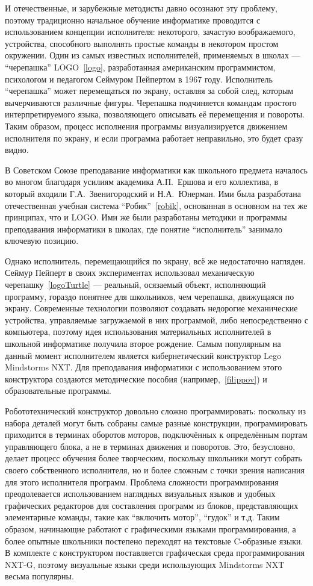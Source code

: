 \documentclass[a4paper]{article}
\begin{document}
И отечественные, и зарубежные методисты давно осознают эту проблему, поэтому традиционно начальное обучение информатике проводится с использованием концепции исполнителя: некоторого, зачастую воображаемого, устройства, способного выполнять простые команды в некотором простом окружении. Один из самых известных исполнителей, применяемых в школах --- ``черепашка'' LOGO~\ref{logo}, разработанная американским программистом, психологом и педагогом Сеймуром Пейпертом в 1967 году. Исполнитель ``черепашка'' может перемещаться по экрану, оставляя за собой след, которым вычерчиваются различные фигуры. Черепашка подчиняется командам простого интерпретируемого языка, позволяющего описывать её перемещения и повороты. Таким образом, процесс исполнения программы визуализируется движением исполнителя по экрану, и если программа работает неправильно, это будет сразу видно. 

В Советском Союзе преподавание информатики как школьного предмета началось во многом благодаря усилиям академика А.П.~Ершова и его коллектива, в который входили Г.А.~Звенигородский и Н.А.~Юнерман. Ими была разработана отечественная учебная система ``Робик''~\ref{robik}, основанная в основном на тех же принципах, что и LOGO. Ими же были разработаны методики и программы преподавания информатики в школах, где понятие ``исполнитель'' занимало ключевую позицию.

Однако исполнитель, перемещающийся по экрану, всё же недостаточно нагляден. Сеймур Пейперт в своих экспериментах использовал механическую черепашку~\ref{logoTurtle} --- реальный, осязаемый объект, исполняющий программу, гораздо понятнее для школьников, чем черепашка, движущаяся по экрану. Современные технологии позволяют создавать недорогие механические устройства, управляемые загружаемой в них программой, либо непосредственно с компьютера, поэтому идея использования материальных исполнителей в школьной информатике получила второе рождение. Самым популярным на данный момент исполнителем является кибернетический конструктор Lego Mindstorms NXT. Для преподавания информатики с использованием этого конструктора создаются методические пособия (например,~\ref{filippov}) и образовательные программы. 

Робототехнический конструктор довольно сложно программировать: поскольку из набора деталей могут быть собраны самые разные конструкции, программировать приходится в терминах оборотов моторов, подключённых к определённым портам управляющего блока, а не в терминах движения и поворотов. Это, безусловно, делает процесс обучения более творческим, поскольку школьники могут собрать своего собственного исполнителя, но и более сложным с точки зрения написания для этого исполнителя программ. Проблема сложности программирования преодолевается использованием наглядных визуальных языков и удобных графических редакторов для составления программ из блоков, представляющих элементарные команды, такие как ``включить мотор'', ``гудок'' и т.д. Таким образом, начинающие работают с графическими языками программирования, а более опытные школьники постепено переходят на текстовые C-образные языки. В комплекте с конструктором поставляется графическая среда программирования NXT-G, поэтому визуальные языки среди использующих Mindstorms NXT весьма популярны.
\end{document}
